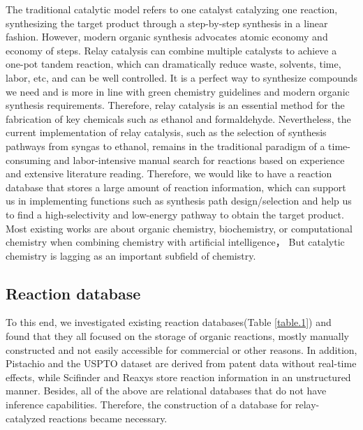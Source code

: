 \documentclass[%
 aip,
 jmp,%
 amsmath,amssymb,
 reprint,%
]{revtex4-2}
\begin{document}
The traditional catalytic model refers to one catalyst catalyzing one reaction, 
synthesizing the target product through a step-by-step synthesis in a linear fashion.
However, modern organic synthesis advocates atomic economy and economy of steps.
Relay catalysis can combine multiple catalysts to achieve a one-pot tandem reaction,
which can dramatically reduce waste, solvents, time, labor, etc, and can be well controlled\cite{wang2020recent}. 
It is a perfect way to synthesize compounds we need and is more in line with green 
chemistry guidelines and modern organic synthesis requirements. Therefore, 
relay catalysis is an essential method for the fabrication of key chemicals
such as ethanol and formaldehyde. Nevertheless, the current implementation of 
relay catalysis, such as the selection of synthesis pathways from syngas to ethanol, 
remains in the traditional paradigm of a time-consuming and labor-intensive manual 
search for reactions based on experience and extensive literature reading. Therefore, 
we would like to have a reaction database that stores a large amount of reaction information, 
which can support us in implementing functions such as synthesis path design/selection 
and help us to find a high-selectivity and low-energy pathway to obtain the target product.
Most existing works are about organic chemistry, biochemistry, or computational chemistry when combining 
chemistry with artificial intelligence， But catalytic chemistry is lagging as an important subfield of 
chemistry.


\subsection{Reaction database}
To this end, we investigated existing reaction databases(Table \ref{table.1}) and found that they 
all focused on the storage of organic reactions, mostly manually constructed and not easily
accessible for commercial or other reasons. In addition, Pistachio and the USPTO dataset are derived from patent data without real-time effects,
while Scifinder and Reaxys store reaction information in an unstructured manner. Besides, all of the 
above are relational databases that do not have inference capabilities. Therefore, the construction 
of a database for relay-catalyzed reactions became necessary.
\end{document}
